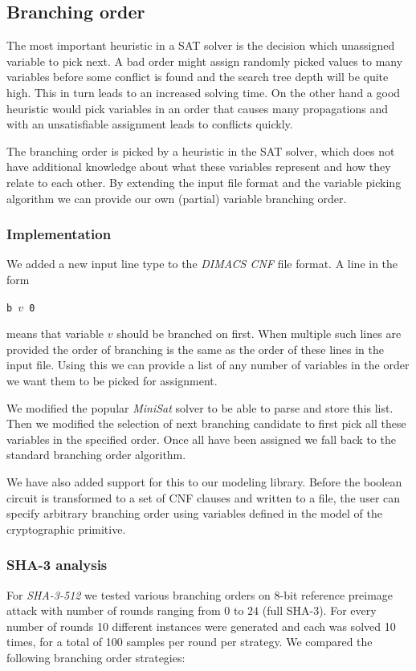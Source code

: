 \subsection{Branching order}
\label{sec:branching-order}

The most important heuristic in a SAT solver is the decision which unassigned variable to pick next.
A bad order might assign randomly picked values to many variables before some conflict is found and the search tree depth will be quite high.
This in turn leads to an increased solving time.
On the other hand a good heuristic would pick variables in an order that causes many propagations and with an unsatisfiable assignment leads to conflicts quickly.

The branching order is picked by a heuristic in the SAT solver, which does not have additional knowledge about what these variables represent and how they relate to each other.
By extending the input file format and the variable picking algorithm we can provide our own (partial) variable branching order.

\subsubsection{Implementation}
\label{sec:branching-order-impl}
We added a new input line type to the \emph{DIMACS CNF} file format.
A line in the form

\centerline{\texttt{b $v$ 0}}

\noindent means that variable $v$ should be branched on first.
When multiple such lines are provided the order of branching is the same as the order of these lines in the input file.
Using this we can provide a list of any number of variables in the order we want them to be picked for assignment.

We modified the popular \emph{MiniSat} solver to be able to parse and store this list.
Then we modified the selection of next branching candidate to first pick all these variables in the specified order.
Once all have been assigned we fall back to the standard branching order algorithm.

We have also added support for this to our modeling library.
Before the boolean circuit is transformed to a set of CNF clauses and written to a file, the user can specify arbitrary branching order using variables defined in the model of the cryptographic primitive.

\subsubsection{SHA-3 analysis}
For \emph{SHA-3-512} we tested various branching orders on $8$-bit reference preimage attack with number of rounds ranging from $0$ to $24$ (full SHA-3).
For every number of rounds 10 different instances were generated and each was solved 10 times, for a total of 100 samples per round per strategy.
We compared the following branching order strategies:

